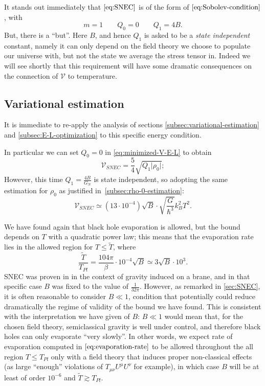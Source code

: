 
It stands out immediately that \(\eqref{eq:SNEC}\) is of the form of \(\eqref{eq:Sobolev-condition}\), with 
\[
m = 1 \quad \quad Q_0 = 0 \quad \quad Q_1 = 4B.	
\]
But, there is a ``but''. Here \(B\), and hence \(Q_1\) is asked to be a \emph{state independent} constant, namely it can only depend on the field theory we choose to populate our universe with, but not the state we average the stress tensor in. 
Indeed we will see shortly that this requirement will have some dramatic consequences on the connection of \(\mathcal{V}\) to temperature.

\subsection{Variational estimation}
It is immediate to re-apply the analysis of sections \ref{subsec:variational-estimation} and \ref{subsec:E-L-optimization} to this specific energy condition.

In particular we can set \(Q_0 = 0\) in \eqref{eq:minimized-V-E-L} to obtain
\[
	\mathcal{V}_{SNEC} = \frac{5}{4}\sqrt{Q_1\vert\rho_0\vert};
\]
However, this time \(Q_1 = \frac{4B}{G_N}\) is state independent, so adopting the same estimation for \(\rho_0\) as justified in~\ref{subsec:rho-0-estimation}:
\[
\mathcal{V}_{SNEC} \simeq (13\cdot 10^{- 4})\sqrt{B} \cdot \sqrt{\frac{G}{\hbar^3}}k_B^2T^2.	
\] 

We have found again that black hole evaporation is allowed, but the bound depends on \(T\) with a quadratic power law; this means that the evaporation rate lies in the allowed region for \(T \le \tilde{T}\), where
\[
\frac{\tilde{T}}{T_{Pl}} = \frac{104\pi}{\beta}\cdot 10^{-4}\sqrt{B} \simeq 3\sqrt{B} \cdot 10^3.
\]
SNEC was proven in \cite{leichenauer2019upper} in the context of gravity induced on a brane, and in that specific case \(B\) was fixed to the value of \(\frac{1}{32\pi}\). However, as remarked in \ref{sec:SNEC}, it is often reasonable to consider \(B\ll 1\), condition that potentially could reduce dramatically the regime of validity of the bound we have found. This is consistent with the interpretation we have given of \(B\): \(B \ll 1\) would mean that, for the chosen field theory, semiclassical gravity is well under control, and therefore black holes can only evaporate ``very slowly''. 
\noindent
In other words, we expect rate of evaporation computed in \(\eqref{eq:evaporation-rate}\) to be allowed throughout the all region \(T\le T_{Pl}\) only with a field theory that induces proper non-classical effects (as large ``enough'' violations of \(T_{\mu\nu}U^{\mu}U^{\nu}\) for example), in which case \(B\) will be at least of order \(10^{-6}\) and \(\tilde{T} \gtrsim T_{Pl}\).

